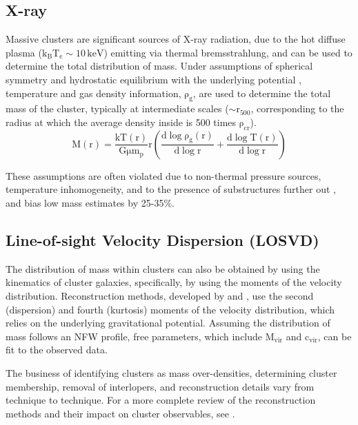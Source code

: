 \subsection{X-ray}
Massive clusters are significant sources of X-ray radiation, due to the hot
diffuse plasma ($\mathrm{k_{B}T_{e} \sim 10 \, keV}$) emitting via thermal
bremsstrahlung, and can be used to determine the total distribution of
mass. Under assumptions of spherical symmetry and hydrostatic equilibrium with
the underlying potential \citep{EV96.1}, temperature and gas density
information, $\mathrm{\rho_{g}}$, are used to determine the total mass of the
cluster, typically at intermediate scales ($\mathrm{\sim r_{500} }$,
corresponding to the radius at which the average density inside is 500 times
$\mathrm{\rho_{cr}}$).
\begin{equation}
\mathrm{M(r) = \frac{k T(r)}{G\mu m_{p}} r \left( \frac{d \log \rho_{g}(r)}{d \log
  r} + \frac{d \log T(r)}{d \log r} \right) }
\end{equation}

These assumptions are often violated due to non-thermal pressure sources,
temperature inhomogeneity, and to the presence of substructures further out
\citep{RA12.1}, and bias low mass estimates by 25-35\%.

\subsection{Line-of-sight Velocity Dispersion (LOSVD)}
The distribution of mass within clusters can also be obtained by using the
kinematics of cluster galaxies, specifically, by using the moments of
the velocity distribution. Reconstruction methods, developed by
\citet{LO02.1} and \citet{LO03.1}, use the second (dispersion) and fourth
(kurtosis) moments of the velocity distribution, which
relies on the  underlying gravitational potential. Assuming the distribution of
mass follows an NFW profile, free parameters, which include $\mathrm{M_{vir}}$
and $\mathrm{c_{vir}}$, can be fit to the observed data.

The business of identifying clusters as mass over-densities, determining
cluster membership, removal of interlopers, and reconstruction details vary from
technique to technique. For a more complete review of the reconstruction
methods and their impact on cluster observables, see \citet{OL14.1}.

